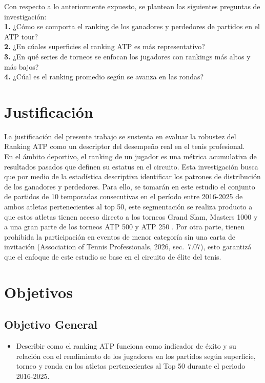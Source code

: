 \documentclass[oneside,11pt]{Latex/Classes/PhDthesisPSnPDF}
\begin{document}
Con respecto a lo anteriormente expuesto, se plantean las siguientes
preguntas de investigación:\\

\textbf{1.} ¿Cómo se comporta el ranking de los ganadores y perdedores
de partidos en el ATP tour?\\

\textbf{2.} ¿En cúales superficies el ranking ATP es más
representativo?\\

\textbf{3.} ¿En qué series de torneos se enfocan los jugadores con
rankings más altos y más bajos?\\

\textbf{4.} ¿Cúal es el ranking promedio según se avanza en las
rondas?\\

\section{Justificación}

La justificación del presente trabajo se sustenta en evaluar la robustez
del Ranking ATP como un descriptor del desempeño real en el tenis
profesional.\\

En el ámbito deportivo, el ranking de un jugador es una métrica
acumulativa de resultados pasados \hspace{0pt}\hspace{0pt}que definen su
estatus en el circuito. Esta investigación busca que por medio de la
estadística descriptiva identificar los patrones de distribución de los
ganadores y perdedores. Para ello, se tomarán en este estudio el
conjunto de partidos de 10 temporadas consecutivas en el período entre
2016-2025 de ambos atletas pertenecientes al top 50, este segmentación
se realiza producto a que estos atletas tienen acceso directo a los
torneos Grand Slam, Masters 1000 y a una gran parte de los torneos ATP
500 y ATP 250 . Por otra parte, tienen prohibida la participación en
eventos de menor categoría sin una carta de invitación (Association of
Tennis Professionals, 2026, sec.~7.07), esto garantizá que el enfoque de
este estudio se base en el circuito de élite del tenis.\\

\section{Objetivos}

\subsection{Objetivo General}
\begin{itemize}
  \item{Describir como el ranking ATP funciona como indicador de éxito y su relación con el rendimiento de los jugadores en los partidos según superficie, torneo y ronda en los atletas pertenecientes al Top 50 durante el periodo 2016-2025.}
\end{itemize}
\end{document}
